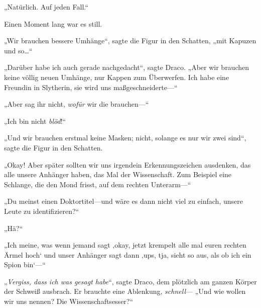 „Natürlich. Auf jeden Fall.“

Einen Moment lang war es still.

„Wir brauchen bessere Umhänge“, sagte die Figur in den Schatten, „mit Kapuzen und so…“

„Darüber habe ich auch gerade nachgedacht“, sagte Draco. „Aber wir brauchen keine völlig neuen Umhänge, nur Kappen zum Überwerfen. Ich habe eine Freundin in Slytherin, sie wird uns maßgeschneiderte—“

„Aber sag ihr nicht, \emph{wofür} wir die brauchen—“

„Ich bin nicht \emph{blöd}!“

„Und wir brauchen erstmal keine Masken; nicht, solange es nur wir zwei sind“, sagte die Figur in den Schatten.

„Okay! Aber später sollten wir uns irgendein Erkennungszeichen ausdenken, das alle unsere Anhänger haben, das Mal der Wissenschaft. Zum Beispiel eine Schlange, die den Mond frisst, auf dem rechten Unterarm—“

„Du meinst einen Doktortitel—und wäre es dann nicht viel zu einfach, unsere Leute zu identifizieren?“

„Hä?“

„Ich meine, was wenn jemand sagt ‚okay, jetzt krempelt alle mal euren rechten Ärmel hoch‘ und unser Anhänger sagt dann ‚ups, tja, sieht so aus, als ob ich ein Spion bin‘—“

„\emph{Vergiss, dass ich was gesagt habe}“, sagte Draco, dem plötzlich am ganzen Körper der Schweiß ausbrach. Er brauchte eine Ablenkung, \emph{schnell}— „Und wie wollen wir uns nennen? Die Wissenschaftsesser?“

